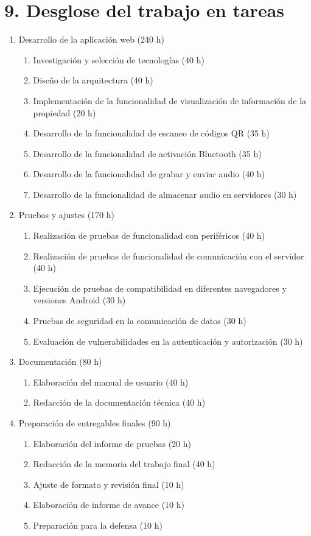 \documentclass[
11pt, %
codirector, %
]{charter}
\begin{document}
\section{9. Desglose del trabajo en tareas}
\label{sec:wbs}
\begin{enumerate}
\item Desarrollo de la aplicación web (240 h)
\begin{enumerate}
    \item Investigación y selección de tecnologías (40 h)
    \item Diseño de la arquitectura (40 h)
    \item Implementación de la funcionalidad de visualización de información de la propiedad (20 h)
    \item Desarrollo de la funcionalidad de escaneo de códigos QR (35 h)
    \item Desarrollo de la funcionalidad de activación Bluetooth (35 h)
    \item Desarrollo de la funcionalidad de grabar y enviar audio (40 h)
    \item Desarrollo de la funcionalidad de almacenar audio en servidores (30 h)
\end{enumerate}
\item Pruebas y ajustes (170 h)
\begin{enumerate}
    \item Realización de pruebas de funcionalidad con periféricos (40 h)
    \item Realización de pruebas de funcionalidad de comunicación con el servidor (40 h)
    \item Ejecución de pruebas de compatibilidad en diferentes navegadores y versiones Android (30 h)
    \item Pruebas de seguridad en la comunicación de datos (30 h)
    \item Evaluación de vulnerabilidades en la autenticación y autorización (30 h)
\end{enumerate}

\item Documentación (80 h)
\begin{enumerate}
    \item Elaboración del manual de usuario (40 h)
    \item Redacción de la documentación técnica (40 h)
\end{enumerate}

\item Preparación de entregables finales (90 h)
\begin{enumerate}
    \item Elaboración del informe de pruebas (20 h)
    \item Redacción de la memoria del trabajo final (40 h)
    \item Ajuste de formato y revisión final (10 h)
    \item Elaboración de informe de avance (10 h)
    \item Preparación para la defensa (10 h) 
\end{enumerate}
\end{enumerate}
\end{document}
